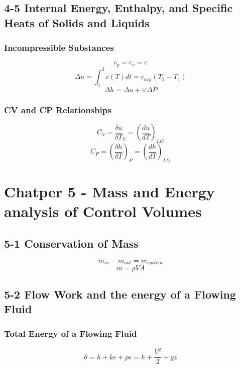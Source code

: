 \documentclass[10pt,landscape]{article}
\begin{document}
\begin{multicols}{3}
\subsection{4-5 Internal Energy, Enthalpy, and Specific Heats of Solids and Liquids}
\subsubsection{Incompressible Substances}
\begin{equation}
    c_p=c_v=c
\end{equation}
\begin{equation}
    \Delta u=\int^2_1c(T)dt=c_{avg}(T_2-T_1)
\end{equation}
\begin{equation}
     \Delta h = \Delta u + \vee\Delta P
\end{equation}
\subsubsection{CV and CP Relationships}
\begin{equation}
    C_V=\frac{\delta u}{\delta T}_V=(\frac{du}{dT})_{I.G}
\end{equation}
\begin{equation}
    C_P=(\frac{\delta h}{\delta T})_P=(\frac{dh}{dT})_{I.G}
\end{equation}

\section{Chatper 5 - Mass and Energy analysis of Control Volumes}
\subsection{5-1 Conservation of Mass}
\begin{equation}
    m_{in}-m_{out}=m_{system}
\end{equation}
\begin{equation}
    \dot{m}=\rho VA
\end{equation}
\subsection{5-2 Flow Work and the energy of a Flowing Fluid}
\subsubsection{Total Energy of a Flowing Fluid}
\begin{equation}
    \theta=h+ke+pe=h+\frac{V^2}{2}+gz
\end{equation}

\end{multicols}
\end{document}
